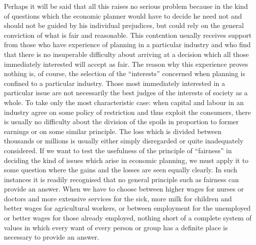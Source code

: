 \documentclass[11pt,openany]{book}
\begin{document}
Perhaps it will be said that all this raises no serious problem because in the kind of questions which the economic planner would have to decide he need not and should not be guided by his individual prejudices, but could rely on the general conviction of what is fair and reasonable. This contention usually receives support from those who have experience of planning in a particular industry and who find that there is no insuperable difficulty about arriving at a decision which all those immediately interested will accept as fair. The reason why this experience proves nothing is, of course, the selection of the ``interests'' concerned when planning is confined to a particular industry. Those most immediately interested in a particular issue are not necessarily the best judges of the interests of society as a whole. To take only the most characteristic case: when capital and labour in an industry agree on some policy of restriction and thus exploit the consumers, there is usually no difficulty about the division of the spoils in proportion to former earnings or on some similar principle. The loss which is divided between thousands or millions is usually either simply disregarded or quite inadequately considered. If we want to test the usefulness of the principle of ``fairness'' in deciding the kind of issues which arise in economic planning, we must apply it to some question where the gains and the losses are seen equally clearly. In such instances it is readily recognised that no general principle such as fairness can provide an answer. When we have to choose between higher wages for nurses or doctors and more extensive services for the sick, more milk for children and better wages for agricultural workers, or between employment for the unemployed or better wages for those already employed, nothing short of a complete system of values in which every want of every person or group has a definite place is necessary to provide an answer.
\end{document}
